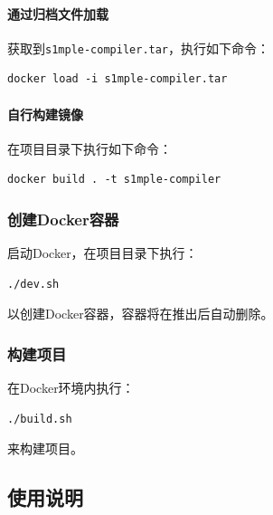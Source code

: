 \documentclass[lang=cn,11pt,a4paper,cite=authornum]{paper}
\begin{document}
\paragraph{通过归档文件加载} 获取到\texttt{s1mple-compiler.tar}，执行如下命令：

\begin{code}
\begin{verbatim}
docker load -i s1mple-compiler.tar
\end{verbatim}
\end{code}

\paragraph{自行构建镜像} 在项目目录下执行如下命令：

\begin{code}
\begin{verbatim}
docker build . -t s1mple-compiler
\end{verbatim}
\end{code}

\subsubsection{创建Docker容器}

启动Docker，在项目目录下执行：

\begin{code}
\begin{verbatim}
./dev.sh
\end{verbatim}
\end{code}

以创建Docker容器，容器将在推出后自动删除。

\subsubsection{构建项目}

在Docker环境内执行：

\begin{code}
\begin{verbatim}
./build.sh
\end{verbatim}
\end{code}

来构建项目。

\subsection{使用说明}
\end{document}
